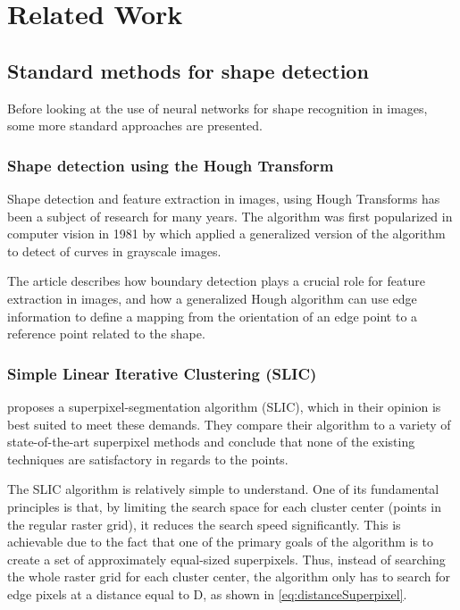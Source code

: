 \chapter{Related Work}

\section{Standard methods for shape detection}
Before looking at the use of neural networks for shape recognition in images, some more standard approaches are presented.

\subsection{Shape detection using the Hough Transform}
Shape detection and feature extraction in images, using Hough Transforms has been a subject of research for many years. The algorithm was first popularized in computer vision in 1981 by \cite{Ballard1981} which applied a generalized version of the algorithm to detect of curves in grayscale images.

The article describes how boundary detection plays a crucial role for feature extraction in images, and how a generalized Hough algorithm can use edge information to define a mapping from the orientation of an edge point to a reference point related to the shape.

\subsection{Simple Linear Iterative Clustering (SLIC)}
\cite{Achanta2012} proposes a superpixel-segmentation algorithm (SLIC), which in their opinion is best suited to meet these demands. They compare their algorithm to a variety of state-of-the-art superpixel methods and conclude that none of the existing techniques are satisfactory in regards to the points.

The SLIC algorithm is relatively simple to understand. One of its fundamental principles is that, by limiting the search space for each cluster center (points in the regular raster grid), it reduces the search speed significantly. This is achievable due to the fact that one of the primary goals of the algorithm is to create a set of approximately equal-sized superpixels. Thus, instead of searching the whole raster grid for each cluster center, the algorithm only has to search for edge pixels at a distance equal to D, as shown in \autoref{eq:distanceSuperpixel}.

